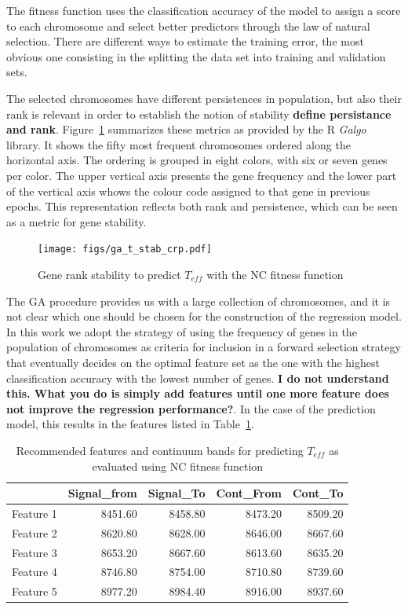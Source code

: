The fitness function uses the classification accuracy of the model to
assign a score to each chromosome and select better predictors through
the law of natural selection. There are different ways to estimate the
training error, the most obvious one consisting in the splitting the
data set into training and validation sets.


The selected chromosomes have different persistences in population,
but also their rank is relevant in order to establish the notion of
stability {\bf define persistance and rank}. Figure~\ref{fig:chr-stab}
summarizes these metrics as provided by the R {\sl Galgo} library. It
shows the fifty most frequent chromosomes ordered along the horizontal
axis. The ordering is grouped in eight colors, with six or seven genes
per color. The upper vertical axis presents the gene frequency and the
lower part of the vertical axis whows the colour code assigned to that
gene in previous epochs.  This representation reflects both rank and
persistence, which can be seen as a metric for gene stability. 

\begin{figure}
\begin {center}
\texttt{[image: figs/ga\_t\_stab\_crp.pdf]}
\caption{Gene rank stability to predict $T_{eff}$ with the NC fitness
  function}
\label{fig:chr-stab}
 \end{center}
\end{figure}

The GA procedure provides us with a large collection of chromosomes,
and it is not clear which one should be chosen for the construction of
the regression model. In this work we adopt the strategy of using the
frequency of genes in the population of chromosomes as criteria for
inclusion in a forward selection strategy that eventually decides on
the optimal feature set as the one with the highest classification
accuracy with the lowest number of genes. {\bf I do not understand
  this. What you do is simply add features until one more feature does
  not improve the regression performance?}. In the case of the \teff
prediction model, this results in the features listed in
Table~\ref{tab:tab_NC_T}.

\begin{table}
\begin{center}
\begin{tabular}{rrrrr}
  \hline
 & Signal\_from & Signal\_To & Cont\_From & Cont\_To \\ 
  \hline
Feature 1 & 8451.60 & 8458.80 & 8473.20 & 8509.20 \\ 
Feature 2 & 8620.80 & 8628.00 & 8646.00 & 8667.60 \\ 
Feature 3 & 8653.20 & 8667.60 & 8613.60 & 8635.20 \\ 
Feature 4 & 8746.80 & 8754.00 & 8710.80 & 8739.60 \\ 
Feature 5 & 8977.20 & 8984.40 & 8916.00 & 8937.60 \\ 
   \hline
\end{tabular}
\caption {Recommended features and continuum bands for predicting
  $T_{eff}$ as evaluated using NC fitness
  function} \label{tab:tab_NC_T}
\end{center}
\end{table}


